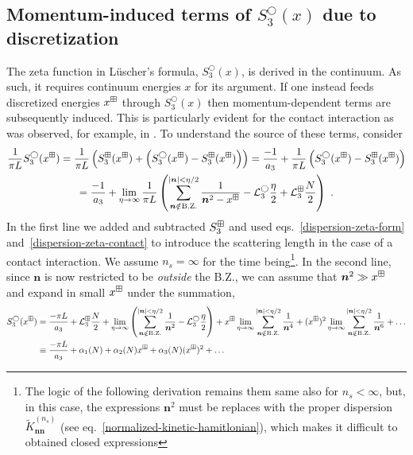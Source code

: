 \subsection{Momentum-induced terms of  \texorpdfstring{$S^\bigcirc_3(x)$}{S3-spherical} due to discretization\label{sect:3d induced momenta}}
The zeta function in L\"uscher's formula, $S^\bigcirc_3(x)$, is derived in the continuum.
As such, it requires continuum energies $x$ for its argument.
If one instead feeds discretized energies $x^\boxplus$ through $S^\bigcirc_3(x)$ then momentum-dependent terms are subsequently induced.
This is particularly evident for the contact interaction as was observed, for example, in \cite{Endres:2012cw}.
To understand the source of these terms, consider
\begin{multline}
\frac{1}{\pi L}S^\bigcirc_3(x^\dispersion)=\frac{1}{\pi L}\left(S^{\dispersion}_3(x^\dispersion)+\left(S^\bigcirc_3(x^\dispersion)-S^{\dispersion}_3(x^\dispersion)\right)\right)=\frac{-1}{a_3}+\frac{1}{\pi L}\left(S^\bigcirc_3(x^\dispersion)-S^{\dispersion}_3(x^\dispersion)\right)\\
=\frac{-1}{a_3}+\lim_{\eta \to\infty}\frac{1}{\pi L}\left(\sum_{\bm n\notin \mathrm{B.Z.}}^{|\bm n|<\eta / 2} \frac{1}{\bm n^{2}-x^\dispersion}-\mathcal{L}^\bigcirc_3\frac{\eta}{2}+\mathcal{L}^\dispersion_3\frac{N}{2}\right)\ .
\end{multline}
In the first line we added and subtracted $S^\boxplus_3$ and used eqs.~\eqref{dispersion-zeta-form} and~\eqref{dispersion-zeta-contact} to introduce the scattering length in the case of a contact interaction.
We assume $n_s=\infty$ for the time being\footnote{
The logic of the following derivation remains them same also for $n_s < \infty$, but, in this case, the expressions $\bm n^2$ must be replaces with the proper dispersion $\tilde K^{(n_s)}_{\bm n \bm n}$ (see eq.~\eqref{normalized-kinetic-hamitlonian}), which makes it difficult to obtained closed expressions}.
In the second line, since $\bm n$ is now restricted to be \emph{outside} the B.Z., we can assume that $\bm n^2\gg x^\boxplus$ and expand in small $x^\boxplus$ under the summation,
\begin{align}
	\label{eqn:observable}
	S^\bigcirc_3(x^\boxplus)
	&= 
	\frac{-\pi L}{a_3}
	+\mathcal{L}^\boxplus_3\frac{N}{2}
	+\lim_{\eta \to\infty}\left(\sum_{\bm n\notin \mathrm{B.Z.}}^{|\bm n|<\eta / 2} \frac{1}{\bm n^{2}}
	-\mathcal{L}^\bigcirc_3\frac{\eta}{2}\right)
	+x^\boxplus\lim_{\eta \to\infty}\sum_{\bm n\notin \mathrm{B.Z.}}^{|\bm n|<\eta / 2} \frac{1}{\bm n^{4}}
	+(x^\boxplus)^2\lim_{\eta \to\infty}\sum_{\bm n\notin \mathrm{B.Z.}}^{|\bm n|<\eta / 2} \frac{1}{\bm n^{6}}
	+ \ldots
	\\
	\label{eq:small x}
	&\equiv \frac{-\pi L}{a_3}+\alpha_1(N)+\alpha_2(N)x^\boxplus+\alpha_3(N)(x^\boxplus)^2
	+\ldots
\end{align}
